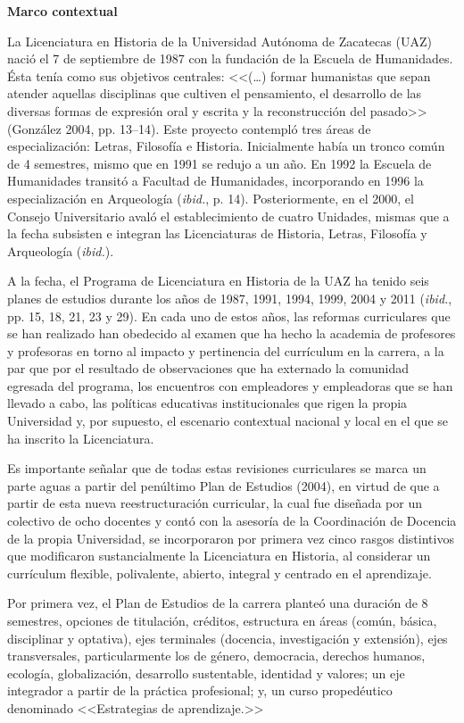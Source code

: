 {\textbf{Marco contextual}

La Licenciatura en Historia de la Universidad Autónoma de Zacatecas (UAZ)
nació el 7 de septiembre de 1987 con la fundación de la Escuela de
Humanidades. Ésta tenía como sus objetivos centrales: <<(\ldots) formar
humanistas que sepan atender aquellas disciplinas que cultiven el
pensamiento, el desarrollo de las diversas formas de expresión oral y
escrita y la reconstrucción del pasado>> (González 2004, pp. 13--14).  Este
proyecto contempló tres áreas de especialización: Letras, Filosofía e
Historia. Inicialmente había un tronco común de 4 semestres, mismo que en
1991 se redujo a un año. En 1992 la Escuela de Humanidades transitó a
Facultad de Humanidades, incorporando en 1996 la especialización en
Arqueología (\textit{ibid.}, p. 14). Posteriormente, en el 2000, el Consejo
Universitario avaló el establecimiento de cuatro Unidades, mismas que a la
fecha subsisten e integran las Licenciaturas de Historia, Letras, Filosofía
y Arqueología (\textit{ibid.}).

A la fecha, el Programa de Licenciatura en Historia de la UAZ ha tenido seis
planes de estudios durante los años de 1987, 1991, 1994, 1999, 2004 y 2011
(\textit{ibid.}, pp. 15, 18, 21, 23 y 29). En cada uno de estos años, las
reformas curriculares que se han realizado han obedecido al examen que ha
hecho la academia de profesores y profesoras en torno al impacto y
pertinencia del currículum en la carrera, a la par que por el resultado de
observaciones que ha externado la comunidad egresada del programa, los
encuentros con empleadores y empleadoras que se han llevado a cabo, las
políticas educativas institucionales que rigen la propia Universidad y, por
supuesto, el escenario contextual nacional y local en el que se ha inscrito
la Licenciatura.

Es importante señalar que de todas estas revisiones curriculares se marca un
parte aguas a partir del penúltimo Plan de Estudios (2004),  en virtud de
que a partir de esta nueva reestructuración curricular, la cual fue
diseñada por un colectivo de ocho docentes y contó con la asesoría de la
Coordinación de Docencia de la propia Universidad, se incorporaron por
primera vez cinco rasgos distintivos que modificaron sustancialmente la 
Licenciatura en Historia, al considerar un currículum flexible,
polivalente, abierto, integral y centrado en el aprendizaje. 

 
Por primera vez, el Plan de Estudios de la carrera planteó una duración de 8
semestres, opciones de titulación, créditos, estructura en áreas (común,
básica, disciplinar y optativa), ejes terminales (docencia, investigación y
extensión), ejes transversales, particularmente los de género, democracia,
derechos humanos, ecología, globalización, desarrollo sustentable,
identidad y valores; un eje integrador a partir de la práctica profesional;
y, un curso propedéutico denominado <<Estrategias de aprendizaje.>>

}
